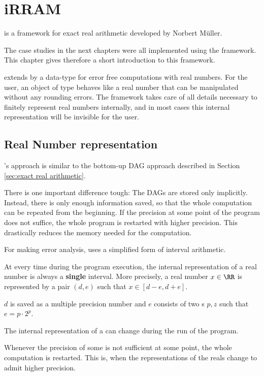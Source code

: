 \section{iRRAM}
	\irram is a \cc framework for exact real arithmetic developed by Norbert M\"uller.

  The case studies in the next chapters were all implemented using the \irram
  framework. 
  This chapter gives therefore a short introduction to this framework.

	\irram extends \cc by a data-type \real for error free computations with real numbers.
  For the user, an object of type \real behaves like a real number that can be
  manipulated without any rounding errors.
  The framework takes care of all details necessary to finitely represent real
  numbers internally, and in most cases this internal representation will be invisible for
  the user.
	\subsection{Real Number representation}
		{\irram}'s approach is similar to the bottom-up DAG approach described in
    Section \ref{sec:exact real arithmetic}.

		There is one important difference tough: The DAGs are  stored only
    implicitly.
		Instead, there is only enough information saved, so that the whole
    computation can be repeated from the beginning.
    If the precision at some point of the program does not suffice, the whole
    program is restarted with higher precision. 
    This drastically reduces the memory needed for the computation.

    For making error analysis, \irram uses a simplified form of interval
    arithmetic.

		At every time during the program execution, the internal representation of
    a real number is always a \textbf{single} interval. 
    More precisely, a real number $x \in \RR$ is represented by a pair $(d,e)$ such that $x \in [d-e, d+e]$.

 		$d$ is saved as a multiple precision number and $e$ consists of two s $p,z$ such that $e = p \cdot 2^p$.

    The internal representation of a \real can change during the run of the
    program.
 		
 	  Whenever the precision of some \real is not sufficient at some point, the whole computation is restarted.
    This is, when the representations of the reals change to admit higher precision.

